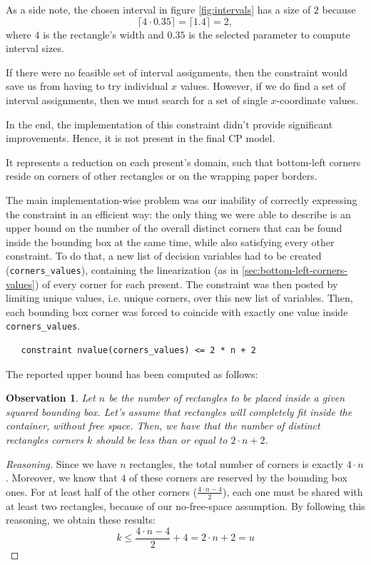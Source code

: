 \documentclass[a4paper,10pt]{article}
\newcounter{subsubsubsection}[subsubsection]
\newtheorem{theorem}{Observation}
\begin{document}
As a side note, the chosen interval in figure \ref{fig:intervals} has a size of $2$ because
$$ \lceil 4 \cdot 0.35 \rceil = \lceil 1.4 \rceil = 2,$$
where $4$ is the rectangle's width and $0.35$ is the selected parameter to compute interval sizes.

If there were no feasible set of interval assignments, then the constraint would save us from having to try individual $x$ values. However, if we do find a set of interval assignments, then we must search for a set of single $x$-coordinate values.

In the end, the implementation of this constraint didn't provide significant improvements. Hence, it is not present in the final CP model.

 \label{sec:anchor-points-v1}
It represents a reduction on each present's domain, such that bottom-left corners reside on corners of other rectangles or on the wrapping paper borders.

The main implementation-wise problem was our inability of correctly expressing the constraint in an efficient way: the only thing we were able to describe is an upper bound on the number of the overall distinct corners that can be found inside the bounding box at the same time, while also satisfying every other constraint.
To do that, a new list of decision variables had to be created (\texttt{corners\_values}), containing the linearization (as in \ref{sec:bottom-left-corners-values}) of every corner for each present. 
The constraint was then posted by limiting unique values, i.e. unique corners, over this new list of variables. Then, each bounding box corner was forced to coincide with exactly one value inside \texttt{corners\_values}.

\begin{verbatim}
   constraint nvalue(corners_values) <= 2 * n + 2
\end{verbatim}

The reported upper bound has been computed as follows:
\begin{theorem}
   Let $n$ be the number of rectangles to be placed inside a given squared bounding box. 
   Let's assume that rectangles will completely fit inside the container, without free space.
   Then, we have that the number of distinct rectangles corners $k$ should be less than or equal to $2\cdot n + 2$.  
\end{theorem}
\begin{proof}[Reasoning]
   Since we have $n$ rectangles, the total number of corners is exactly $4 \cdot n$. Moreover, we know that $4$ of these corners are reserved by the bounding box ones.
   For at least half of the other corners ($\frac{4 \cdot n - 4}{2}$), each one must be shared with at least two rectangles, because of our no-free-space assumption.
   By following this reasoning, we obtain these results:
   $$
   k \leq \frac{4 \cdot n - 4}{2} + 4 = 2\cdot n + 2 = u
   $$
\end{proof}
\end{document}

